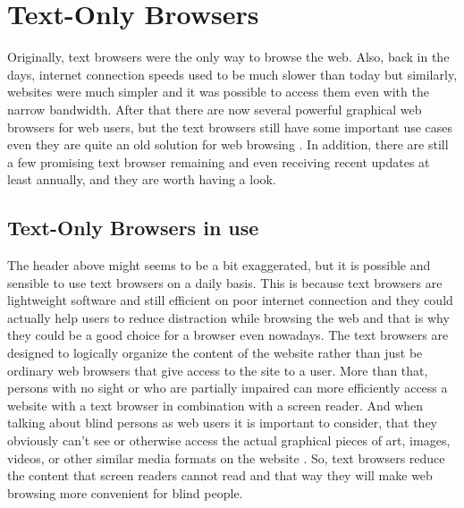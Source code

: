 %
%
% 
% 


\chapter{Text-Only Browsers}%
\label{ch:tb}

Originally, text browsers were the only way to browse the web. Also,
back in the days, internet connection speeds used to be much slower
than today but similarly, websites were much simpler and it was
possible to access them even with the narrow bandwidth. After
that there are now several powerful graphical web browsers for web
users, but the text browsers still have some important use cases even
they are quite an old solution for web browsing
\parencite{best-text-browsers}. In addition, there are still a few
promising text browser remaining and even receiving recent updates at
least annually, and they are worth having a look.


\section{Text-Only Browsers in use}%
\label{sec:tb-known}

The header above might seems to be a bit exaggerated, but it is
possible and sensible to use text browsers on a daily
basis. This is because text browsers are lightweight software and
still efficient on poor internet connection and they could actually
help users to reduce distraction while browsing the web and that is why
they could be a good choice for a browser even nowadays. The text
browsers are designed to logically organize the content of the website
rather than just be ordinary web browsers that give access to
the site to a user. More than that, persons with no sight or who are
partially impaired can more efficiently access a website with a text
browser in combination with a screen reader. And when talking about
blind persons as web users it is important to consider, that they
obviously can't see or otherwise access the actual graphical pieces of
art, images, videos, or other similar media formats on the
website \parencite[Chapter 2]{webbie}. So, text browsers reduce the
content that screen readers cannot read and that way they will make
web browsing more convenient for blind people.


